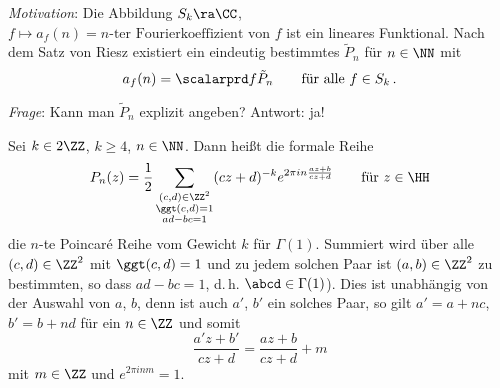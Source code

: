 \emph{Motivation}: Die Abbildung $S_k \ra \CC$, $f \mapsto a_f(n) = \text{$n$-ter Fourierkoeffizient von $f$}$ ist ein lineares Funktional.
Nach dem Satz von Riesz existiert ein eindeutig bestimmtes $\tilde P_n$ für $n\in\NN$ mit
\[
	a_f(n) = \scalarprd f{\tilde P_n} \qquad \text{für alle } f\in S_k\,.
\]

\emph{Frage}: Kann man $\tilde P_n$ explizit angeben? Antwort: ja!

\begin{defi}
	Sei $k \in 2\ZZ$, $k \geq 4$, $n\in\NN$. Dann heißt die formale Reihe
	\[
		P_n(z)
		= \frac{1}{2} \sum_{\substack{(c,d)\in\ZZ^2 \\ \ggt(c,d) = 1 \\ ad-bc = 1}} (cz+d)^{-k} e^{2\pi in \frac{az+b}{cz+d}}
		\qquad \text{für } z \in \HH
	\]
	die $n$-te Poincaré Reihe vom Gewicht $k$ für $\Gamma(1)$.
	Summiert wird über alle $(c,d) \in \ZZ^2$ mit $\ggt(c,d) = 1$ und zu jedem solchen Paar ist $(a,b) \in \ZZ^2$ zu bestimmten, so dass $ad-bc = 1$, d.\,h. $\abcd \in \Gamma(1)$).
	Dies ist unabhängig von der Auswahl von $a$, $b$, denn ist auch $a'$, $b'$ ein solches Paar, so gilt $a' = a+nc$, $b' = b + nd$ für ein $n \in \ZZ$ und somit
	\[
		\frac{a'z+b'}{cz+d} = \frac{az+b}{cz + d} + m
	\]
	mit $m \in \ZZ$ und $e^{2\pi inm} = 1$.
\end{defi}